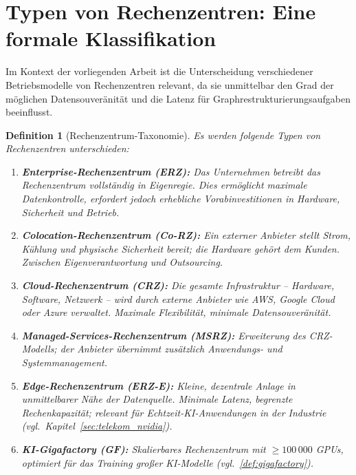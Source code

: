 ﻿\documentclass[12pt, a4paper, openany]{report}
\newtheorem{definition}[theorem]{Definition}
\begin{document}
\section{Typen von Rechenzentren: Eine formale Klassifikation}
\label{sec:rz_typen}

Im Kontext der vorliegenden Arbeit ist die Unterscheidung verschiedener
Betriebsmodelle von Rechenzentren relevant, da sie unmittelbar den Grad
der möglichen Datensouveränität und die Latenz für Graphrestrukturierungsaufgaben
beeinflusst.

\begin{definition}[Rechenzentrum-Taxonomie]
	\label{def:rz_taxonomie}
	Es werden folgende Typen von Rechenzentren unterschieden:
	\begin{enumerate}[label=(\roman*)]
		\item \textbf{Enterprise-Rechenzentrum (ERZ):} Das Unternehmen betreibt
		das Rechenzentrum vollständig in Eigenregie. Dies ermöglicht maximale
		Datenkontrolle, erfordert jedoch erhebliche Vorabinvestitionen in
		Hardware, Sicherheit und Betrieb.
		\item \textbf{Colocation-Rechenzentrum (Co-RZ):} Ein externer Anbieter
		stellt Strom, Kühlung und physische Sicherheit bereit; die Hardware
		gehört dem Kunden. Zwischen Eigenverantwortung und Outsourcing.
		\item \textbf{Cloud-Rechenzentrum (CRZ):} Die gesamte Infrastruktur --
		Hardware, Software, Netzwerk -- wird durch externe Anbieter wie AWS,
		Google Cloud oder Azure verwaltet. Maximale Flexibilität, minimale
		Datensouveränität.
		\item \textbf{Managed-Services-Rechenzentrum (MSRZ):} Erweiterung des
		CRZ-Modells; der Anbieter übernimmt zusätzlich Anwendungs- und
		Systemmanagement.
		\item \textbf{Edge-Rechenzentrum (ERZ-E):} Kleine, dezentrale Anlage in
		unmittelbarer Nähe der Datenquelle. Minimale Latenz, begrenzte
		Rechenkapazität; relevant für Echtzeit-KI-Anwendungen in der
		Industrie (vgl.\ Kapitel~\ref{sec:telekom_nvidia}).
		\item \textbf{KI-Gigafactory (GF):} Skalierbares Rechenzentrum mit
		$\geq 100\,000$ GPUs, optimiert für das Training großer KI-Modelle
		(vgl.\ \cref{def:gigafactory}).
	\end{enumerate}
\end{definition}
\end{document}
